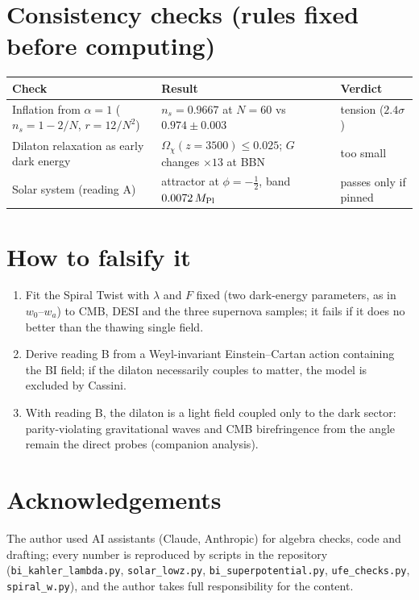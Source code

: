 \documentclass[11pt]{article}
\newcommand{\Mp}{M_{\rm Pl}}
\begin{document}
\section{Consistency checks (rules fixed before computing)}
\begin{center}\small
\begin{tabular}{p{}p{}p{}}
\toprule
Check & Result & Verdict \\
\midrule
Inflation from $\alpha=1$ ($n_s=1-2/N$, $r=12/N^2$) & $n_s=0.9667$ at $N=60$ vs $0.974\pm0.003$ & tension ($2.4\sigma$) \\
Dilaton relaxation as early dark energy & $\Omega_\chi(z{=}3500)\le0.025$; $G$ changes $\times13$ at BBN & too small \\
Solar system (reading A) & attractor at $\phi=-\tfrac12$, band $0.0072\,\Mp$ & passes only if pinned \\
\bottomrule
\end{tabular}
\end{center}

\section{How to falsify it}
\begin{enumerate}
\item Fit the Spiral Twist with $\lambda$ and $F$ fixed (two dark-energy parameters, as in $w_0$--$w_a$) to CMB, DESI
and the three supernova samples; it fails if it does no better than the thawing single field.
\item Derive reading B from a Weyl-invariant Einstein--Cartan action containing the BI field; if the dilaton
necessarily couples to matter, the model is excluded by Cassini.
\item With reading B, the dilaton is a light field coupled only to the dark sector: parity-violating gravitational
waves and CMB birefringence from the angle remain the direct probes (companion analysis).
\end{enumerate}

\section*{Acknowledgements}
The author used AI assistants (Claude, Anthropic) for algebra checks, code and drafting; every number is reproduced
by scripts in the repository (\texttt{bi\_kahler\_lambda.py}, \texttt{solar\_lowz.py}, \texttt{bi\_superpotential.py},
\texttt{ufe\_checks.py}, \texttt{spiral\_w.py}), and the author takes full responsibility for the content.
\end{document}
